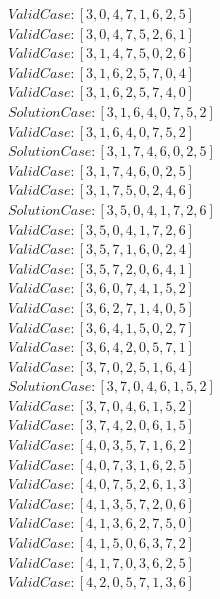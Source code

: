 \documentclass[10pt,a4paper]{article}
\begin{document}
				$Valid Case   : [3, 0, 4, 7, 1, 6, 2, 5]$\\
				$Valid Case   : [3, 0, 4, 7, 5, 2, 6, 1]$\\
				$Valid Case   : [3, 1, 4, 7, 5, 0, 2, 6]$\\
				$Valid Case   : [3, 1, 6, 2, 5, 7, 0, 4]$\\
				$Valid Case   : [3, 1, 6, 2, 5, 7, 4, 0]$\\
				$Solution Case: [3, 1, 6, 4, 0, 7, 5, 2]$\\
				$Valid Case   : [3, 1, 6, 4, 0, 7, 5, 2]$\\
				$Solution Case: [3, 1, 7, 4, 6, 0, 2, 5]$\\
				$Valid Case   : [3, 1, 7, 4, 6, 0, 2, 5]$\\
				$Valid Case   : [3, 1, 7, 5, 0, 2, 4, 6]$\\
				$Solution Case: [3, 5, 0, 4, 1, 7, 2, 6]$\\
				$Valid Case   : [3, 5, 0, 4, 1, 7, 2, 6]$\\
				$Valid Case   : [3, 5, 7, 1, 6, 0, 2, 4]$\\
				$Valid Case   : [3, 5, 7, 2, 0, 6, 4, 1]$\\
				$Valid Case   : [3, 6, 0, 7, 4, 1, 5, 2]$\\
				$Valid Case   : [3, 6, 2, 7, 1, 4, 0, 5]$\\
				$Valid Case   : [3, 6, 4, 1, 5, 0, 2, 7]$\\
				$Valid Case   : [3, 6, 4, 2, 0, 5, 7, 1]$\\
				$Valid Case   : [3, 7, 0, 2, 5, 1, 6, 4]$\\
				$Solution Case: [3, 7, 0, 4, 6, 1, 5, 2]$\\
				$Valid Case   : [3, 7, 0, 4, 6, 1, 5, 2]$\\
				$Valid Case   : [3, 7, 4, 2, 0, 6, 1, 5]$\\
				$Valid Case   : [4, 0, 3, 5, 7, 1, 6, 2]$\\
				$Valid Case   : [4, 0, 7, 3, 1, 6, 2, 5]$\\
				$Valid Case   : [4, 0, 7, 5, 2, 6, 1, 3]$\\
				$Valid Case   : [4, 1, 3, 5, 7, 2, 0, 6]$\\
				$Valid Case   : [4, 1, 3, 6, 2, 7, 5, 0]$\\
				$Valid Case   : [4, 1, 5, 0, 6, 3, 7, 2]$\\
				$Valid Case   : [4, 1, 7, 0, 3, 6, 2, 5]$\\
				$Valid Case   : [4, 2, 0, 5, 7, 1, 3, 6]$\\
\end{document}
